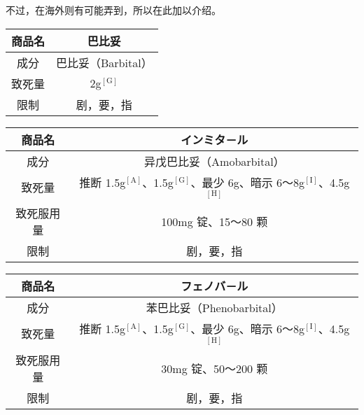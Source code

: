 \documentclass[UTF8]{ctexart}
\begin{document}
不过，在海外则有可能弄到，所以在此加以介绍。

\begin{table}[htbp]
\begin{center}
\begin{tabular}{cc}

\toprule
商品名 & 巴比妥
 \\
\midrule
成分 & 巴比妥（Barbital） \\
致死量 & 2g$^\mathrm{[G]}$ \\
限制& 剧，要，指 \\
\bottomrule
\end{tabular}
\end{center}
\end{table}


\begin{table}[htbp]
\begin{center}
\begin{tabular}{cc}

\toprule
商品名 & インミタ－ル
 \\
\midrule
成分 & 异戊巴比妥（Amobarbital） \\
致死量 & 推断 1.5g$^\mathrm{[A]}$、1.5g$^\mathrm{[G]}$、最少 6g、暗示 6～8g$^\mathrm{[I]}$、4.5g$^\mathrm{[H]}$ \\
致死服用量 & 100mg 锭、15～80 颗 \\
限制& 剧，要，指 \\
\bottomrule
\end{tabular}
\end{center}
\end{table}


\begin{table}[htbp]
\begin{center}
\begin{tabular}{cc}

\toprule
商品名 & フェノバ－ル
 \\
\midrule
成分 & 苯巴比妥（Phenobarbital） \\
致死量 & 推断 1.5g$^\mathrm{[A]}$、1.5g$^\mathrm{[G]}$、最少 6g、暗示 6～8g$^\mathrm{[I]}$、4.5g$^\mathrm{[H]}$ \\
致死服用量 & 30mg 锭、50～200 颗 \\
限制& 剧，要，指 \\
\bottomrule
\end{tabular}
\end{center}
\end{table}
\end{document}
